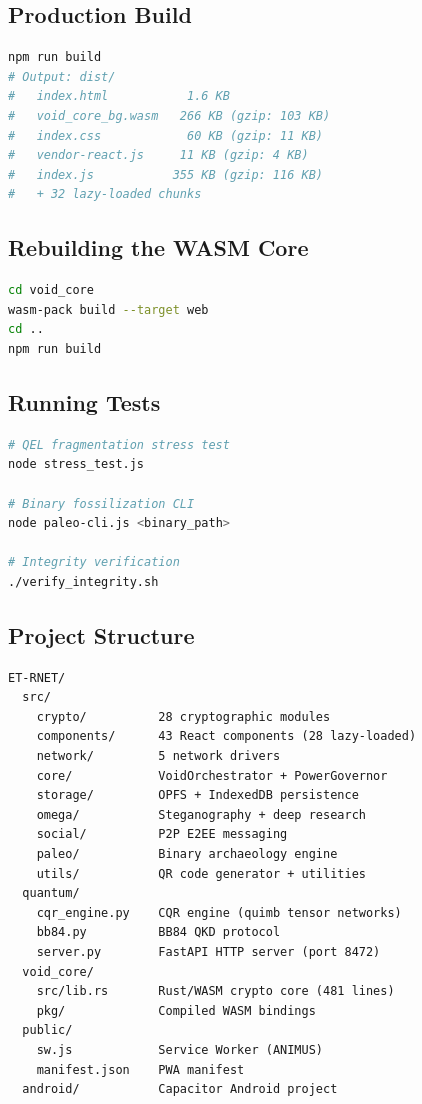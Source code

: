 \documentclass[11pt,a4paper]{article}
\begin{document}
\subsection{Production Build}
\begin{lstlisting}[language=bash]
npm run build
# Output: dist/
#   index.html           1.6 KB
#   void_core_bg.wasm   266 KB (gzip: 103 KB)
#   index.css            60 KB (gzip: 11 KB)
#   vendor-react.js     11 KB (gzip: 4 KB)
#   index.js           355 KB (gzip: 116 KB)
#   + 32 lazy-loaded chunks
\end{lstlisting}

\subsection{Rebuilding the WASM Core}
\begin{lstlisting}[language=bash]
cd void_core
wasm-pack build --target web
cd ..
npm run build
\end{lstlisting}

\subsection{Running Tests}
\begin{lstlisting}[language=bash]
# QEL fragmentation stress test
node stress_test.js

# Binary fossilization CLI
node paleo-cli.js <binary_path>

# Integrity verification
./verify_integrity.sh
\end{lstlisting}

\subsection{Project Structure}
\begin{lstlisting}[caption=Directory Layout]
ET-RNET/
  src/
    crypto/          28 cryptographic modules
    components/      43 React components (28 lazy-loaded)
    network/         5 network drivers
    core/            VoidOrchestrator + PowerGovernor
    storage/         OPFS + IndexedDB persistence
    omega/           Steganography + deep research
    social/          P2P E2EE messaging
    paleo/           Binary archaeology engine
    utils/           QR code generator + utilities
  quantum/
    cqr_engine.py    CQR engine (quimb tensor networks)
    bb84.py          BB84 QKD protocol
    server.py        FastAPI HTTP server (port 8472)
  void_core/
    src/lib.rs       Rust/WASM crypto core (481 lines)
    pkg/             Compiled WASM bindings
  public/
    sw.js            Service Worker (ANIMUS)
    manifest.json    PWA manifest
  android/           Capacitor Android project
\end{lstlisting}
\end{document}
